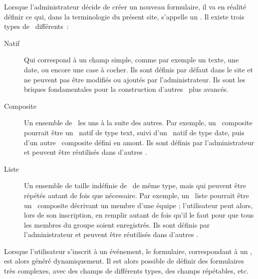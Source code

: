 Lorsque l'administrateur décide de créer un nouveau formulaire, il va en réalité définir ce qui, dans la terminologie du présent site, s'appelle un \formwidget. Il existe trois types de \formwidget\ différents~:
\begin{description}
    \item[Natif] Qui correspond à un champ simple, comme par exemple un texte, une date, ou encore une case à cocher. Ils sont définis par défaut dans le site et ne peuvent pas être modifiés ou ajoutés par l'administrateur. Ils sont les briques fondamentales pour la construction d'autres \formwidget\ plus avancés.
    \item[Composite] Un ensemble de \formwidget\ les uns à la suite des autres. Par exemple, un \formwidget\ composite pourrait être un \formwidget\ natif de type text, suivi d'un \formwidget\ natif de type date, puis d'un autre \formwidget\ composite défini en amont. Ils sont définis par l'administrateur et peuvent être réutilisés dans d'autres \formwidget.
    \item[Liste] Un ensemble de taille indéfinie de \formwidget\ de même type, mais qui peuvent être répétés autant de fois que nécessaire. Par exemple, un \formwidget\ liste pourrait être un \formwidget\ composite décrivant un membre d'une équipe ; l'utilisateur peut alors, lors de son inscription, en remplir autant de fois qu'il le faut pour que tous les membres du groupe soient enregistrés. Ils sont définis par l'administrateur et peuvent être réutilisés dans d'autres \formwidget.
\end{description}

Lorsque l'utilisateur s'inscrit à un événement, le formulaire, correspondant à un \formwidget, est alors généré dynamiquement. Il est alors possible de définir des formulaires très complexes, avec des champs de différents types, des champs répétables, etc.
